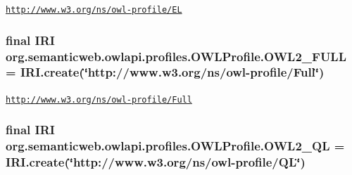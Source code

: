 \href{http://www.w3.org/ns/owl-profile/EL}{\tt http\-://www.\-w3.\-org/ns/owl-\/profile/\-E\-L} \hypertarget{interfaceorg_1_1semanticweb_1_1owlapi_1_1profiles_1_1_o_w_l_profile_a6b3c30696598241b6f748a425bb5c78b}{
\subsubsection[{O\-W\-L2\-\_\-\-F\-U\-L\-L}]{\setlength{\rightskip}{0pt plus 5cm}final {\bf I\-R\-I} org.\-semanticweb.\-owlapi.\-profiles.\-O\-W\-L\-Profile.\-O\-W\-L2\-\_\-\-F\-U\-L\-L = {\bf I\-R\-I.\-create}(\char`\"{}http\-://www.\-w3.\-org/ns/owl-\/profile/Full\char`\"{})\hspace{0.3cm}{\ttfamily [static]}}}\label{interfaceorg_1_1semanticweb_1_1owlapi_1_1profiles_1_1_o_w_l_profile_a6b3c30696598241b6f748a425bb5c78b}
\href{http://www.w3.org/ns/owl-profile/Full}{\tt http\-://www.\-w3.\-org/ns/owl-\/profile/\-Full} \hypertarget{interfaceorg_1_1semanticweb_1_1owlapi_1_1profiles_1_1_o_w_l_profile_a67484a6098fe77e4b9852b1895a4547b}{
\subsubsection[{O\-W\-L2\-\_\-\-Q\-L}]{\setlength{\rightskip}{0pt plus 5cm}final {\bf I\-R\-I} org.\-semanticweb.\-owlapi.\-profiles.\-O\-W\-L\-Profile.\-O\-W\-L2\-\_\-\-Q\-L = {\bf I\-R\-I.\-create}(\char`\"{}http\-://www.\-w3.\-org/ns/owl-\/profile/Q\-L\char`\"{})\hspace{0.3cm}{\ttfamily [static]}}}\label{interfaceorg_1_1semanticweb_1_1owlapi_1_1profiles_1_1_o_w_l_profile_a67484a6098fe77e4b9852b1895a4547b}
